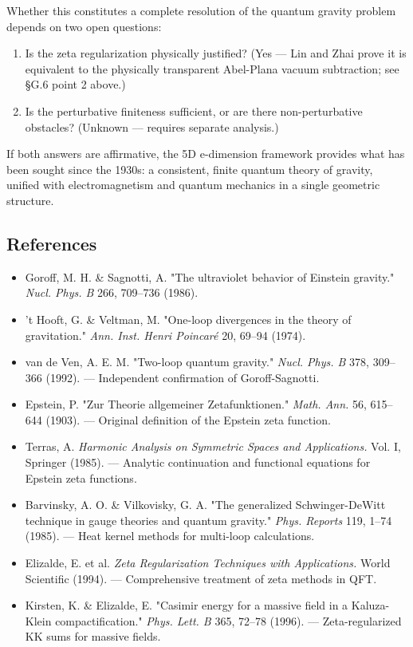 \documentclass[aps,prd,preprint,superscriptaddress,longbibliography,floatfix]{revtex4-2}
\theoremstyle{remark}
\begin{document}
Whether this constitutes a complete resolution of the quantum gravity problem depends on two open questions:


\begin{enumerate}
  \item Is the zeta regularization physically justified? (Yes --- Lin and Zhai prove it is equivalent to the physically transparent Abel-Plana vacuum subtraction; see \S{}G.6 point 2 above.)
  \item Is the perturbative finiteness sufficient, or are there non-perturbative obstacles? (Unknown --- requires separate analysis.)
\end{enumerate}

If both answers are affirmative, the 5D e-dimension framework provides what has been sought since the 1930s: a consistent, finite quantum theory of gravity, unified with electromagnetism and quantum mechanics in a single geometric structure.



\subsection{References}


\begin{itemize}
  \item Goroff, M. H. \& Sagnotti, A. "The ultraviolet behavior of Einstein gravity." \textit{Nucl. Phys. B} 266, 709--736 (1986).
  \item 't Hooft, G. \& Veltman, M. "One-loop divergences in the theory of gravitation." \textit{Ann. Inst. Henri Poincar\'{e}} 20, 69--94 (1974).
  \item van de Ven, A. E. M. "Two-loop quantum gravity." \textit{Nucl. Phys. B} 378, 309--366 (1992). --- Independent confirmation of Goroff-Sagnotti.
  \item Epstein, P. "Zur Theorie allgemeiner Zetafunktionen." \textit{Math. Ann.} 56, 615--644 (1903). --- Original definition of the Epstein zeta function.
  \item Terras, A. \textit{Harmonic Analysis on Symmetric Spaces and Applications.} Vol. I, Springer (1985). --- Analytic continuation and functional equations for Epstein zeta functions.
  \item Barvinsky, A. O. \& Vilkovisky, G. A. "The generalized Schwinger-DeWitt technique in gauge theories and quantum gravity." \textit{Phys. Reports} 119, 1--74 (1985). --- Heat kernel methods for multi-loop calculations.
  \item Elizalde, E. et al. \textit{Zeta Regularization Techniques with Applications.} World Scientific (1994). --- Comprehensive treatment of zeta methods in QFT.
  \item Kirsten, K. \& Elizalde, E. "Casimir energy for a massive field in a Kaluza-Klein compactification." \textit{Phys. Lett. B} 365, 72--78 (1996). --- Zeta-regularized KK sums for massive fields.
\end{itemize}
\end{document}
